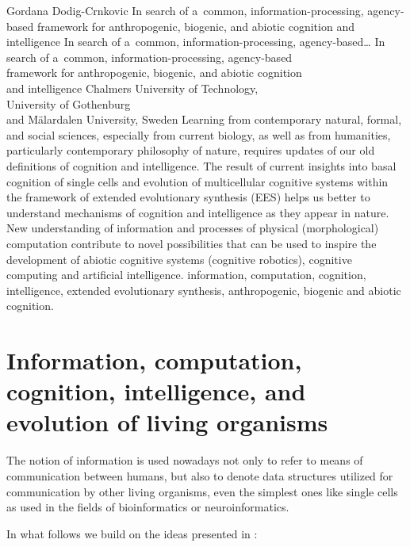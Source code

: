 \begin{artengenv}{Gordana Dodig-Crnkovic}
	{In search of a~common, information-processing, agency-based framework for anthropogenic, biogenic, and abiotic cognition and intelligence}
	{In search of a~common, information-processing, agency-based\ldots}
	{In search of a~common, information-processing, agency-based\\framework for anthropogenic, biogenic, and abiotic cognition\\and intelligence}
	{Chalmers University of Technology,\\University of Gothenburg\\and Mälardalen University, Sweden}
	{Learning from contemporary natural, formal, and social sciences, especially from current biology, as well as from humanities, particularly contemporary philosophy of nature, requires updates of our old definitions of cognition and intelligence. The result of current insights into basal cognition of single cells and evolution of multicellular cognitive systems within the framework of extended evolutionary synthesis (EES) helps us better to understand mechanisms of cognition and intelligence as they appear in nature. New understanding of information and processes of physical (morphological) computation contribute to novel possibilities that can be used to inspire the development of abiotic cognitive systems (cognitive robotics), cognitive computing and artificial intelligence.
	}
	{information, computation, cognition, intelligence, extended evolutionary synthesis, anthropogenic, biogenic and abiotic cognition.}


\section*{Information, computation, cognition, intelligence, and evolution of living organisms}
The notion of information is used nowadays not only to refer to means of communication between humans, but also to denote data structures utilized for communication by other living organisms, even the simplest ones like single cells as used in the fields of bioinformatics or neuroinformatics.

In what follows we build on the ideas presented in
\parencite[][]{dodig-crnkovic_computational_2017}:%


\end{artengenv}
